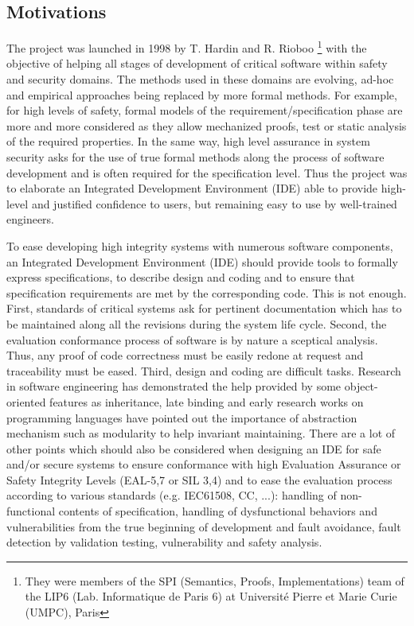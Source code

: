 

\subsection*{Motivations}

The {\foc} project was launched in 1998 by T. Hardin and R. Rioboo
\cite{HardinRiobooTSI04} \footnote{They were members of the SPI (Semantics, Proofs,
Implementations) team of the LIP6 (Lab. Informatique de Paris 6)
at Universit\'e Pierre et Marie Curie (UMPC), Paris}
with the objective of helping all stages of  development of critical software
within safety and security domains. The  methods used in these domains
are evolving, ad-hoc and empirical approaches  being replaced by more formal
methods. For example, for high levels of safety, formal models of the
requirement/specification phase are more and more considered as they
allow mechanized proofs, test or static analysis of the required
properties.  In the same way, high level assurance in system security asks for
the use of true formal methods along the process of software
development and is often required for the specification level.
Thus  the project was to elaborate an Integrated
Development Environment (IDE) able to provide high-level and justified
confidence to users, but remaining easy to use by well-trained
engineers.

To ease developing high integrity systems with numerous software
components, an Integrated Development Environment (IDE) should provide
tools to formally express specifications, to describe design and
coding and to ensure that specification requirements are met by the
corresponding code. This is not enough. First, standards of critical systems
ask for pertinent documentation which has to be maintained along all the revisions
during the system life cycle. Second, the evaluation conformance
process of software is by nature a sceptical analysis. Thus, any proof
of code correctness must be easily redone at request and traceability
must be eased. Third, design
and coding are difficult tasks. Research in software engineering has
demonstrated the help provided by some object-oriented
features as inheritance, late binding and early research works on
programming languages have pointed out the importance of abstraction
mechanism such as modularity to help invariant maintaining. There are
a lot of other points which should also be considered when designing
an IDE for safe and/or secure systems to ensure conformance with high
Evaluation Assurance or Safety Integrity Levels (EAL-5,7 or SIL 3,4)
and to ease the evaluation process according to various standards
(e.g. IEC61508, CC, ...): handling of non-functional contents of
specification, handling of dysfunctional behaviors and vulnerabilities
from the true beginning of development and fault avoidance, fault
detection by validation testing, vulnerability and safety analysis.


